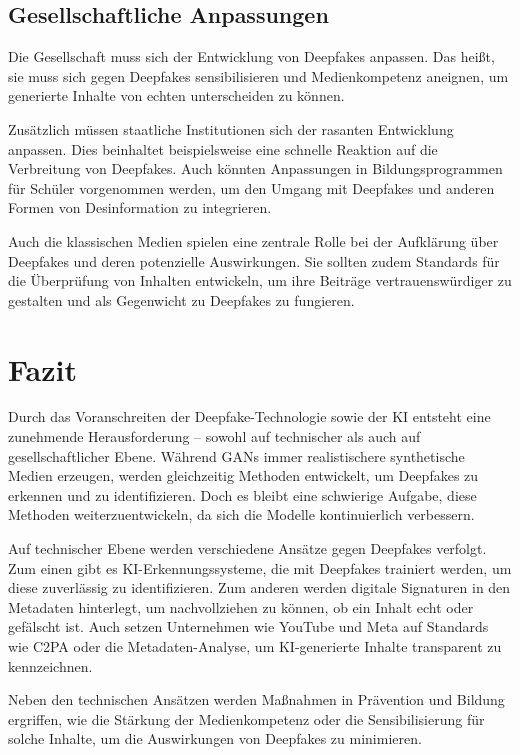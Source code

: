 \documentclass[a4paper,12pt]{article}
\begin{document}
\subsection{Gesellschaftliche Anpassungen}
Die Gesellschaft muss sich der Entwicklung von Deepfakes anpassen. Das heißt, sie muss sich gegen Deepfakes sensibilisieren und Medienkompetenz aneignen, um generierte Inhalte von echten unterscheiden zu können.\cite{KIT2021}\cite{KAS2024}\cite{Fraunhofer2024}

Zusätzlich müssen staatliche Institutionen sich der rasanten Entwicklung anpassen. Dies beinhaltet beispielsweise eine schnelle Reaktion auf die Verbreitung von Deepfakes. Auch könnten Anpassungen in Bildungsprogrammen für Schüler vorgenommen werden, um den Umgang mit Deepfakes und anderen Formen von Desinformation zu integrieren.\cite{SWP2024}\cite{Fraunhofer2024}

Auch die klassischen Medien spielen eine zentrale Rolle bei der Aufklärung über Deepfakes und deren potenzielle Auswirkungen. Sie sollten zudem Standards für die Überprüfung von Inhalten entwickeln, um ihre Beiträge vertrauenswürdiger zu gestalten und als Gegenwicht zu Deepfakes zu fungieren.\cite{SWP2024}\cite{Fraunhofer2024}
\newpage

\section{Fazit}
Durch das Voranschreiten der Deepfake-Technologie sowie der KI entsteht eine zunehmende Herausforderung – sowohl auf technischer als auch auf gesellschaftlicher Ebene. Während GANs immer realistischere synthetische Medien erzeugen, werden gleichzeitig Methoden entwickelt, um Deepfakes zu erkennen und zu identifizieren. Doch es bleibt eine schwierige Aufgabe, diese Methoden weiterzuentwickeln, da sich die Modelle kontinuierlich verbessern.

Auf technischer Ebene werden verschiedene Ansätze gegen Deepfakes verfolgt. Zum einen gibt es KI-Erkennungssysteme, die mit Deepfakes trainiert werden, um diese zuverlässig zu identifizieren. Zum anderen werden digitale Signaturen in den Metadaten hinterlegt, um nachvollziehen zu können, ob ein Inhalt echt oder gefälscht ist.
Auch setzen Unternehmen wie YouTube und Meta auf Standards wie C2PA oder die Metadaten-Analyse, um KI-generierte Inhalte transparent zu kennzeichnen.

Neben den technischen Ansätzen werden Maßnahmen in Prävention und Bildung ergriffen, wie die Stärkung der Medienkompetenz oder die Sensibilisierung für solche Inhalte, um die Auswirkungen von Deepfakes zu minimieren.
\end{document}
